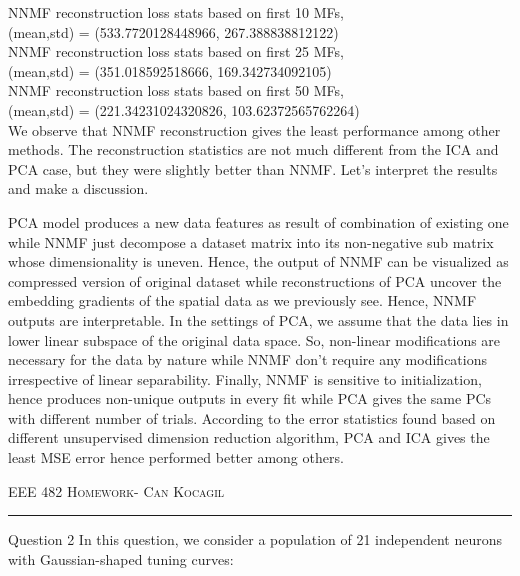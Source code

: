 \documentclass[12pt]{amsart}
\makeatletter
\def\section{\@startsection{section}{1}%
  \z@{.7\linespacing\@plus\linespacing}{.5\linespacing}%
  {\normalfont\scshape}}%
\makeatother
\begin{document}
NNMF reconstruction loss stats based on first 10 MFs,  \\
 (mean,std) = (533.7720128448966, 267.388838812122)  \\
NNMF reconstruction loss stats based on first 25 MFs,   \\
 (mean,std) = (351.018592518666, 169.342734092105)  \\
NNMF reconstruction loss stats based on first 50 MFs,   \\
 (mean,std) = (221.34231024320826, 103.62372565762264)  \\

We observe that NNMF reconstruction gives the least performance among other methods. The reconstruction statistics are not much different from the ICA and PCA case, but they were slightly better than NNMF. Let's interpret the results and make a discussion.

\bigskip

PCA model produces a new data features as result of combination of existing one while NNMF just decompose a dataset matrix into its non-negative sub matrix whose dimensionality is uneven. Hence, the output of NNMF can be visualized as compressed version of original dataset while reconstructions of PCA uncover the embedding gradients of the spatial data as we previously see. Hence, NNMF outputs are interpretable. In the settings of PCA, we assume that the data lies in lower linear subspace of the original data space. So, non-linear modifications are necessary for the data by nature while NNMF don't require any modifications irrespective of linear separability. Finally, NNMF is sensitive to initialization, hence produces non-unique outputs in every fit while PCA gives the same PCs with different number of trials. According to the error statistics found based on different unsupervised dimension reduction algorithm, PCA and ICA gives the least MSE error hence performed better among others.



\newpage
{\scshape EEE 482} \hfill {\scshape \large  Homework-\relax} \hfill {\scshape Can Kocagil}
\smallskip
\hrule
\vspace{2mm}


\section{Question 2}
In this question, we consider a population of 21 independent neurons with Gaussian-shaped tuning curves:
\end{document}
